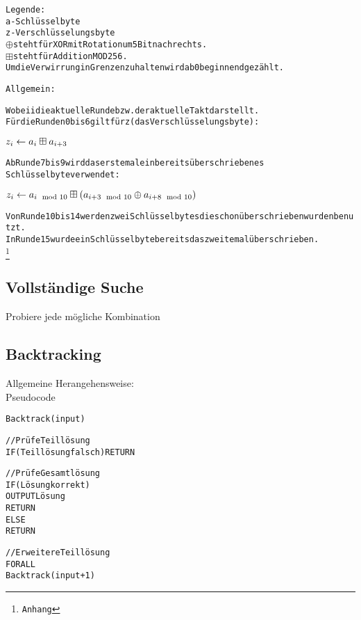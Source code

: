 \documentclass[a4paper,12pt]{article}
\begin{document}
\begin{alltt}
Legende:
a - Schlüsselbyte
z - Verschlüsselungsbyte
\( \oplus \) steht für XOR mit Rotation um 5 Bit nach rechts.
\( \boxplus \) steht für Addition MOD 256.
Um die Verwirrung in Grenzen zu halten wird ab 0 beginnend gezählt.

Allgemein:

Wobei i die aktuelle Runde bzw. der aktuelle Takt darstellt.
Für die Runden 0 bis 6 gilt für z (das Verschlüsselungsbyte):

    \( z\sb{i} \leftarrow a\sb{i} \boxplus a\sb{i+3} \)

Ab Runde 7 bis 9 wird das erste mal ein bereits überschriebenes 
Schlüsselbyte verwendet:

    \( z\sb{i} \leftarrow a\sb{i \mod 10} \boxplus (a\sb{i+3 \mod 10} \oplus a\sb{i+8 \mod 10}) \)

Von Runde 10 bis 14 werden zwei Schlüsselbytes die schon überschrieben wurden benutzt.
In Runde 15 wurde ein Schlüsselbyte bereits das zweite mal überschrieben.
\footnote{Anhang}
\end{alltt}



\subsection{Vollständige Suche}

Probiere jede mögliche Kombination

\subsection{Backtracking}

Allgemeine Herangehensweise: \\
Pseudocode

\begin{alltt}
Backtrack(input) {

    //Prüfe Teillösung
    IF (Teillösung falsch) RETURN

    //Prüfe Gesamtlösung
    IF (Lösung korrekt) 
        OUTPUT Lösung
        RETURN
    ELSE 
        RETURN

    //Erweitere Teillösung
    FOR ALL
        Backtrack(input + 1)
}
\end{alltt}

\end{document}
